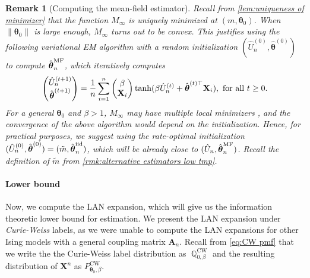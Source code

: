 \documentclass[preprint,reqno]{imsart}
\newtheorem{remark}{Remark}[section]
\newcommand{\ttheta}{\boldsymbol{\theta}}
\DeclareMathOperator{\QQ}{\mathbb{Q}}
\newcommand{\A}{\mathbf{A}}
\newcommand{\X}{\mathbf{X}}
\DeclareMathOperator{\sumin}{\sum_{\mathnormal i=1}^{\mathnormal n}}
\newcommand{\thetaiid}{\hat{\boldsymbol \theta}^{\text{iid}}_{\mathnormal n}}
\newcommand{\thetamf}{\hat{\boldsymbol \theta}^{\text{MF}}_{\mathnormal n}}
\begin{document}
\begin{remark}[Computing the mean-field estimator]
    Recall from \cref{lem:uniqueness of minimizer} that the function $M_{\infty}$ is uniquely minimized at $(m, \ttheta_0)$. When $\|\ttheta_0\|$ is large enough, %
    $M_{\infty}$ turns out to be convex. This justifies using the following variational EM algorithm with a random initialization $(\hat{U}_n^{(0)}, \hat{\ttheta}^{(0)})$ to compute $\thetamf$, which iteratively computes
    \begin{align*}
        \begin{pmatrix}
            \hat{U}_n^{(t+1)} \\
            \hat{\ttheta}^{(t+1)}
        \end{pmatrix} = \frac{1}{n} \sumin \begin{pmatrix}
            \beta \\
            \X_i
        \end{pmatrix} \tanh(\beta \hat{U}_n^{(t)} + \hat{\ttheta}^{(t) \top} \X_i), ~ \mbox{for all } t \ge 0.
    \end{align*}
    For a general $\ttheta_0$ and $\beta > 1$, $M_{\infty}$ may have multiple local minimizers \citep[e.g. see Theorem 1 in][]{xu2018benefits}, and the convergence of the above algorithm would depend on the initialization. Hence, for practical purposes, we suggest using the rate-optimal initialization $(\hat{U}_n^{(0)}, \hat{\ttheta}^{(0)}) = (\tilde{m}, \thetaiid)$, which will be already close to $(\hat{U}_n, \thetamf)$. Recall the definition of $\tilde{m}$ from \cref{rmk:alternative estimators low tmp}.

\end{remark}

\paragraph{Lower bound}
Now, we compute the LAN expansion, which will give us the information theoretic lower bound for estimation. We present the LAN expansion under \emph{Curie-Weiss} labels, as we were unable to compute the LAN expansions for other Ising models with a general coupling matrix $\A_n$. Recall from \eqref{eq:CW pmf} that we write the the Curie-Weiss label distribution as $\QQ_{0,\beta}^{\text{CW}}$ and the resulting distribution of $\X^n$ as $P_{\ttheta_0,\beta}^{\text{CW}}$.
\end{document}
